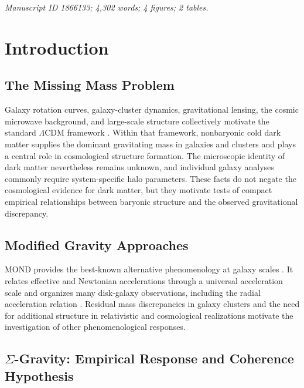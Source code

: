 \documentclass[aps,prd,reprint,superscriptaddress,showpacs,floatfix,longbibliography]{revtex4-2}
\begin{document}
\maketitle

\noindent\textit{Manuscript ID 1866133; 4,302 words; 4 figures; 2 tables.}

\section{Introduction}

\subsection{The Missing Mass Problem}

Galaxy rotation curves, galaxy-cluster dynamics, gravitational lensing, the cosmic microwave background, and large-scale structure collectively motivate the standard $\Lambda$CDM framework \cite{ref1,ref2}. Within that framework, nonbaryonic cold dark matter supplies the dominant gravitating mass in galaxies and clusters and plays a central role in cosmological structure formation. The microscopic identity of dark matter nevertheless remains unknown, and individual galaxy analyses commonly require system-specific halo parameters. These facts do not negate the cosmological evidence for dark matter, but they motivate tests of compact empirical relationships between baryonic structure and the observed gravitational discrepancy.

\subsection{Modified Gravity Approaches}

MOND provides the best-known alternative phenomenology at galaxy scales \cite{ref3,ref4}. It relates effective and Newtonian accelerations through a universal acceleration scale and organizes many disk-galaxy observations, including the radial acceleration relation \cite{ref5}. Residual mass discrepancies in galaxy clusters and the need for additional structure in relativistic and cosmological realizations motivate the investigation of other phenomenological responses.

\subsection{$\Sigma$-Gravity: Empirical Response and Coherence Hypothesis}
\end{document}
